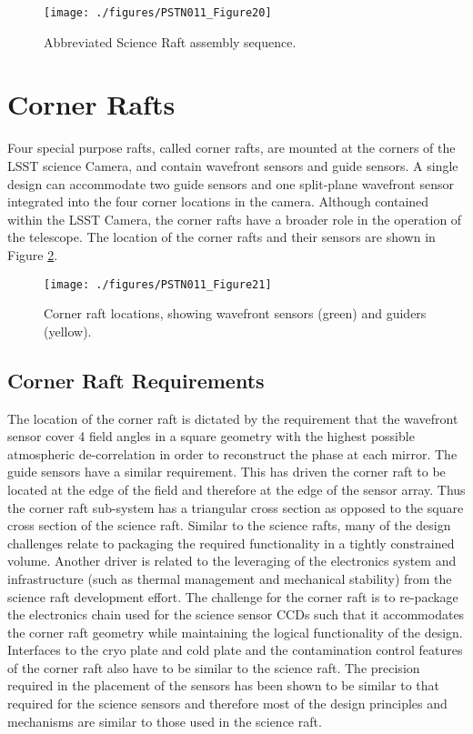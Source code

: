 \begin{figure}[htbp]
\begin{center}
\texttt{[image: ./figures/PSTN011\_Figure20]}
\caption{Abbreviated Science Raft assembly sequence.}
\label{fig:Fig20}
\end{center}
\end{figure}

\section{Corner Rafts}

Four special purpose rafts, called corner rafts, are mounted at the corners of the LSST science Camera,
and contain wavefront sensors and guide sensors. A single design can accommodate two guide sensors
and one split-plane wavefront sensor integrated into the four corner locations in the camera. Although
contained within the LSST Camera, the corner rafts have a broader role in the operation of the
telescope. The location of the corner rafts and their sensors are shown in Figure \ref{fig:Fig21}.

\begin{figure}[htbp]
\begin{center}
\texttt{[image: ./figures/PSTN011\_Figure21]}
\caption{Corner raft locations, showing wavefront sensors (green) and guiders (yellow).}
\label{fig:Fig21}
\end{center}
\end{figure}

\subsection{Corner Raft Requirements}

The location of the corner raft is dictated by the requirement that the wavefront sensor cover 4 field
angles in a square geometry with the highest possible atmospheric de-correlation in order to
reconstruct the phase at each mirror. The guide sensors have a similar requirement. This has driven the
corner raft to be located at the edge of the field and therefore at the edge of the sensor array. Thus the
corner raft sub-system has a triangular cross section as opposed to the square cross section of the
science raft. Similar to the science rafts, many of the design challenges relate to packaging the required
functionality in a tightly constrained volume.
Another driver is related to the leveraging of the electronics system and infrastructure (such as thermal
management and mechanical stability) from the science raft development effort. The challenge for the
corner raft is to re-package the electronics chain used for the science sensor CCDs such that it
accommodates the corner raft geometry while maintaining the logical functionality of the design.
Interfaces to the cryo plate and cold plate and the contamination control features of the corner raft also
have to be similar to the science raft.
The precision required in the placement of the sensors has been shown to be similar to that required for
the science sensors and therefore most of the design principles and mechanisms are similar to those
used in the science raft.

